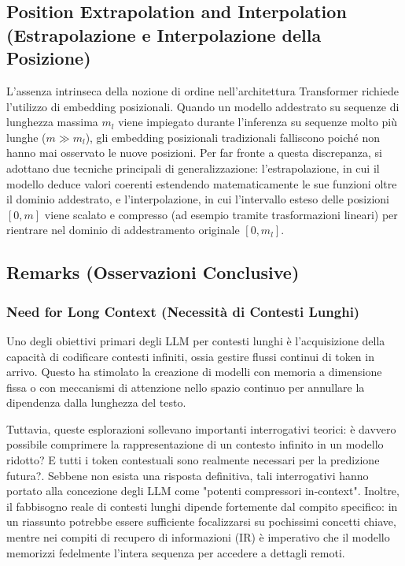 \subsection{Position Extrapolation and Interpolation (Estrapolazione e Interpolazione della Posizione)}

L'assenza intrinseca della nozione di ordine nell'architettura Transformer richiede l'utilizzo di embedding posizionali. Quando un modello addestrato su sequenze di lunghezza massima $m_l$ viene impiegato durante l'inferenza su sequenze molto più lunghe ($m \gg m_l$), gli embedding posizionali tradizionali falliscono poiché non hanno mai osservato le nuove posizioni. Per far fronte a questa discrepanza, si adottano due tecniche principali di generalizzazione: l'estrapolazione, in cui il modello deduce valori coerenti estendendo matematicamente le sue funzioni oltre il dominio addestrato, e l'interpolazione, in cui l'intervallo esteso delle posizioni $[0, m]$ viene scalato e compresso (ad esempio tramite trasformazioni lineari) per rientrare nel dominio di addestramento originale $[0, m_l]$.

\subsection{Remarks (Osservazioni Conclusive)}

\subsubsection{Need for Long Context (Necessità di Contesti Lunghi)}

Uno degli obiettivi primari degli LLM per contesti lunghi è l'acquisizione della capacità di codificare contesti infiniti, ossia gestire flussi continui di token in arrivo. Questo ha stimolato la creazione di modelli con memoria a dimensione fissa o con meccanismi di attenzione nello spazio continuo per annullare la dipendenza dalla lunghezza del testo.

Tuttavia, queste esplorazioni sollevano importanti interrogativi teorici: è davvero possibile comprimere la rappresentazione di un contesto infinito in un modello ridotto? E tutti i token contestuali sono realmente necessari per la predizione futura?. Sebbene non esista una risposta definitiva, tali interrogativi hanno portato alla concezione degli LLM come "potenti compressori in-context". Inoltre, il fabbisogno reale di contesti lunghi dipende fortemente dal compito specifico: in un riassunto potrebbe essere sufficiente focalizzarsi su pochissimi concetti chiave, mentre nei compiti di recupero di informazioni (IR) è imperativo che il modello memorizzi fedelmente l'intera sequenza per accedere a dettagli remoti.

